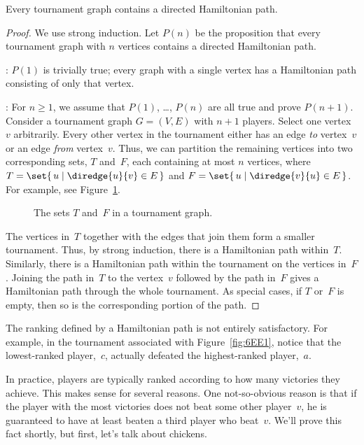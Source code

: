 \begin{theorem}\label{thm:hamilton_tournament}
Every tournament graph contains a directed Hamiltonian path.
\end{theorem}

\begin{proof}

We use strong induction.  Let $P(n)$ be the proposition that every
tournament graph with $n$ vertices contains a directed Hamiltonian
path.

: $P(1)$ is trivially true; every graph with
a single vertex has a Hamiltonian path consisting of only that vertex.

: For $n \ge 1$, we assume that $P(1)$,
\dots, $P(n)$ are all true and prove $P(n + 1)$.  Consider a
tournament graph $G = (V, E)$ with $n + 1$ players.  Select one
vertex~$v$ arbitrarily.  Every other vertex in the tournament either
has an edge \emph{to} vertex~$v$ or an edge \emph{from} vertex~$v$.
Thus, we can partition the remaining vertices into two corresponding
sets, $T$ and~$F$, each containing at most $n$ vertices, where $T =
\set{\, u \mid \diredge{u}{v} \in E \,}$ and
$F = \set{\, u \mid \diredge{v}{u} \in E \,}$.
For example, see Figure~\ref{fig:6EE2}.

\begin{figure}

\missinggraphic

\caption{The sets $T$ and~$F$ in a tournament graph.}

\label{fig:6EE2}

\end{figure}

The vertices in~$T$ together with the edges that join them form a
smaller tournament.  Thus, by strong induction, there is a Hamiltonian
path within~$T$.  Similarly, there is a Hamiltonian path within the
tournament on the vertices in~$F$.  Joining the path in~$T$ to the
vertex~$v$ followed by the path in~$F$ gives a Hamiltonian path
through the whole tournament.  As special cases, if $T$ or~$F$ is
empty, then so is the corresponding portion of the path.
\end{proof}

The ranking defined by a Hamiltonian path is not entirely
satisfactory.  For example, in the tournament associated with
Figure~\ref{fig:6EE1}, notice that the lowest-ranked player,~$c$,
actually defeated the highest-ranked player,~$a$.

In practice, players are typically ranked according to how many
victories they achieve.  This makes sense for several reasons.  One
not-so-obvious reason is that if the player with the most victories
does not beat some other player~$v$, he is guaranteed to have at least
beaten a third player who beat~$v$.  We'll prove this fact shortly,
but first, let's talk about chickens.

